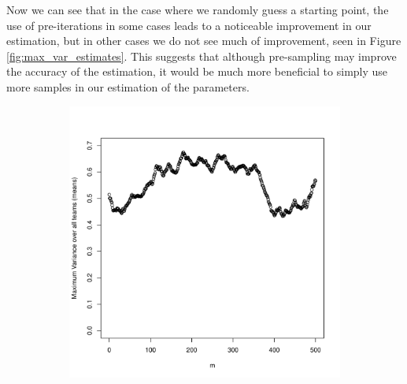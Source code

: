 \documentclass[11pt]{article} %
\begin{document}
Now we can see that in the case where we randomly guess a starting point, the use of pre-iterations in some cases leads to a noticeable improvement in our estimation, but in other cases we do not see much of improvement, seen in Figure \ref{fig:max_var_estimates}. This suggests that although pre-sampling may improve the accuracy of the estimation, it would be much more beneficial to simply use more samples in our estimation of the parameters.
\begin{figure}[h]
	\centering
	\begin{subfigure}{0.48\textwidth}
		\centering
		\includegraphics[width=1.0\textwidth]{"../R File/max_var_estimates_1"}
	\end{subfigure}%
	\hspace{0.04\textwidth}%
	\begin{subfigure}{0.48\textwidth}
		\centering

\end{subfigure}
\end{figure}
\end{document}
